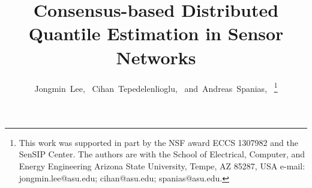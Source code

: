 \documentclass[journal]{IEEEtran}
\begin{document}
%
\title{Consensus-based Distributed Quantile Estimation in Sensor Networks}
%
%
%

\author{Jongmin~Lee,~\IEEEmembership{}
        Cihan~Tepedelenlioglu,~
        and~Andreas~Spanias,~%
        \vspace{-5mm}
\thanks{This work was supported in part by the NSF award ECCS 1307982 and the SenSIP Center. The authors are with the School of Electrical, Computer, and Energy Engineering Arizona State University, Tempe, AZ 85287, USA e-mail: jongmin.lee@asu.edu; cihan@asu.edu; spanias@asu.edu.}%
}


% 
%
\end{document}
